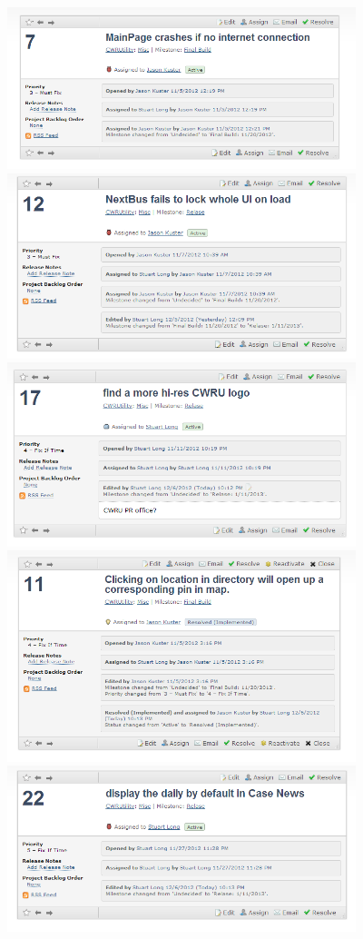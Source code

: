 \documentclass[pdftex,12pt,letter]{article}
\begin{document}
\FloatBarrier
\includegraphics[width=4in]{bugs13.png}
\FloatBarrier
\includegraphics[width=4in]{bugs14.png}
\FloatBarrier
\includegraphics[width=4in]{bugs15.png}
\FloatBarrier
\includegraphics[width=4in]{bugs16.png}
\FloatBarrier
\includegraphics[width=4in]{bugs17.png}
\end{document}

